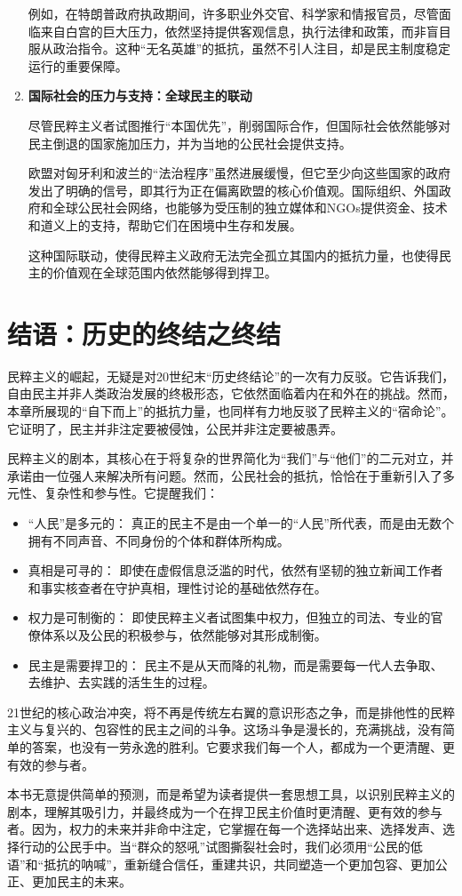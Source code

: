 \begin{enumerate}
    例如，在特朗普政府执政期间，许多职业外交官、科学家和情报官员，尽管面临来自白宫的巨大压力，依然坚持提供客观信息，执行法律和政策，而非盲目服从政治指令。这种“无名英雄”的抵抗，虽然不引人注目，却是民主制度稳定运行的重要保障。

    \item \textbf{国际社会的压力与支持：全球民主的联动}

    尽管民粹主义者试图推行“本国优先”，削弱国际合作，但国际社会依然能够对民主倒退的国家施加压力，并为当地的公民社会提供支持。

    欧盟对匈牙利和波兰的“法治程序”虽然进展缓慢，但它至少向这些国家的政府发出了明确的信号，即其行为正在偏离欧盟的核心价值观。国际组织、外国政府和全球公民社会网络，也能够为受压制的独立媒体和NGOs提供资金、技术和道义上的支持，帮助它们在困境中生存和发展。

    这种国际联动，使得民粹主义政府无法完全孤立其国内的抵抗力量，也使得民主的价值观在全球范围内依然能够得到捍卫。
\end{enumerate}

\section{结语：历史的终结之终结}

民粹主义的崛起，无疑是对20世纪末“历史终结论”的一次有力反驳。它告诉我们，自由民主并非人类政治发展的终极形态，它依然面临着内在和外在的挑战。然而，本章所展现的“自下而上”的抵抗力量，也同样有力地反驳了民粹主义的“宿命论”。它证明了，民主并非注定要被侵蚀，公民并非注定要被愚弄。

民粹主义的剧本，其核心在于将复杂的世界简化为“我们”与“他们”的二元对立，并承诺由一位强人来解决所有问题。然而，公民社会的抵抗，恰恰在于重新引入了多元性、复杂性和参与性。它提醒我们：

\begin{itemize}
    \item “人民”是多元的： 真正的民主不是由一个单一的“人民”所代表，而是由无数个拥有不同声音、不同身份的个体和群体所构成。
    \item 真相是可寻的： 即使在虚假信息泛滥的时代，依然有坚韧的独立新闻工作者和事实核查者在守护真相，理性讨论的基础依然存在。
    \item 权力是可制衡的： 即使民粹主义者试图集中权力，但独立的司法、专业的官僚体系以及公民的积极参与，依然能够对其形成制衡。
    \item 民主是需要捍卫的： 民主不是从天而降的礼物，而是需要每一代人去争取、去维护、去实践的活生生的过程。
\end{itemize}

21世纪的核心政治冲突，将不再是传统左右翼的意识形态之争，而是排他性的民粹主义与复兴的、包容性的民主之间的斗争。这场斗争是漫长的，充满挑战，没有简单的答案，也没有一劳永逸的胜利。它要求我们每一个人，都成为一个更清醒、更有效的参与者。

本书无意提供简单的预测，而是希望为读者提供一套思想工具，以识别民粹主义的剧本，理解其吸引力，并最终成为一个在捍卫民主价值时更清醒、更有效的参与者。因为，权力的未来并非命中注定，它掌握在每一个选择站出来、选择发声、选择行动的公民手中。当“群众的怒吼”试图撕裂社会时，我们必须用“公民的低语”和“抵抗的呐喊”，重新缝合信任，重建共识，共同塑造一个更加包容、更加公正、更加民主的未来。